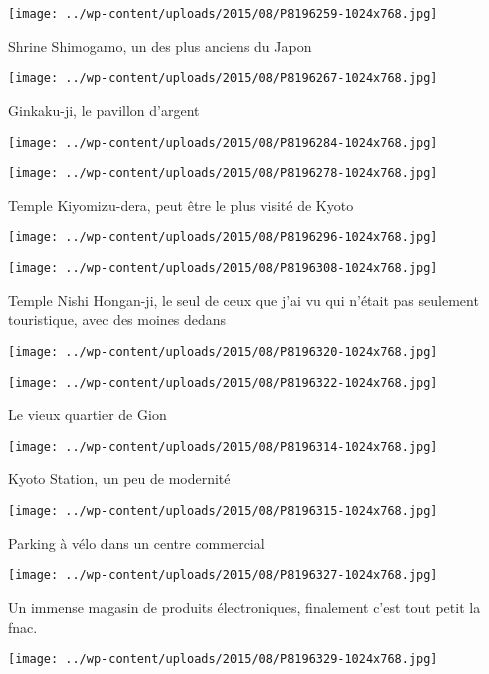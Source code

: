  \newline
 \newline
\centerline{\texttt{[image: ../wp-content/uploads/2015/08/P8196259-1024x768.jpg]} } 
 \newline
 Shrine Shimogamo, un des plus anciens du Japon \newline
 \newline
\centerline{\texttt{[image: ../wp-content/uploads/2015/08/P8196267-1024x768.jpg]} } 
 \newline
 Ginkaku-ji, le pavillon d'argent \newline
 \newline
\centerline{\texttt{[image: ../wp-content/uploads/2015/08/P8196284-1024x768.jpg]} } 
 \newline
 \newline
\centerline{\texttt{[image: ../wp-content/uploads/2015/08/P8196278-1024x768.jpg]} } 
 \newline
 Temple Kiyomizu-dera, peut être le plus visité de Kyoto \newline
 \newline
\centerline{\texttt{[image: ../wp-content/uploads/2015/08/P8196296-1024x768.jpg]} } 
 \newline
 \newline
\centerline{\texttt{[image: ../wp-content/uploads/2015/08/P8196308-1024x768.jpg]} } 
 \newline
 Temple Nishi Hongan-ji, le seul de ceux que j'ai vu qui n'était pas seulement touristique, avec des moines dedans \newline
 \newline
\centerline{\texttt{[image: ../wp-content/uploads/2015/08/P8196320-1024x768.jpg]} } 
 \newline
 \newline
\centerline{\texttt{[image: ../wp-content/uploads/2015/08/P8196322-1024x768.jpg]} } 
 \newline
 Le vieux quartier de Gion \newline
 \newline
\centerline{\texttt{[image: ../wp-content/uploads/2015/08/P8196314-1024x768.jpg]} } 
 \newline
 Kyoto Station, un peu de modernité \newline
 \newline
\centerline{\texttt{[image: ../wp-content/uploads/2015/08/P8196315-1024x768.jpg]} } 
 \newline
 Parking à vélo dans un centre commercial \newline
 \newline
\centerline{\texttt{[image: ../wp-content/uploads/2015/08/P8196327-1024x768.jpg]} } 
 \newline
 Un immense magasin de produits électroniques, finalement c'est tout petit la fnac. \newline
 \newline
\centerline{\texttt{[image: ../wp-content/uploads/2015/08/P8196329-1024x768.jpg]} } 
 \newline

\newpage
 
